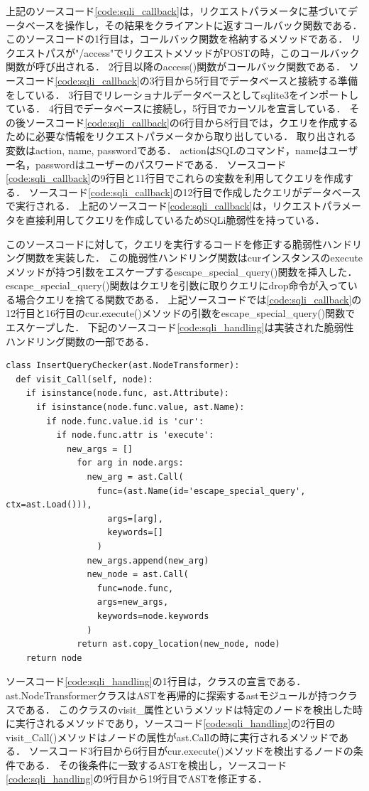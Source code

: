 \documentclass[a4paper,12pt]{jreport}
\begin{document}
上記のソースコード\ref{code:sqli_callback}は，リクエストパラメータに基づいてデータベースを操作し，その結果をクライアントに返すコールバック関数である．
このソースコードの1行目は，コールバック関数を格納するメソッドである．
リクエストパスが"/access"でリクエストメソッドがPOSTの時，このコールバック関数が呼び出される．
2行目以降のaccess()関数がコールバック関数である．
ソースコード\ref{code:sqli_callback}の3行目から5行目でデータベースと接続する準備をしている．
3行目でリレーショナルデータベースとしてsqlite3をインポートしている．
4行目でデータベースに接続し，5行目でカーソルを宣言している．
その後ソースコード\ref{code:sqli_callback}の6行目から8行目では，クエリを作成するために必要な情報をリクエストパラメータから取り出している．
取り出される変数はaction, name, passwordである．
actionはSQLのコマンド，nameはユーザー名，passwordはユーザーのパスワードである．
ソースコード\ref{code:sqli_callback}の9行目と11行目でこれらの変数を利用してクエリを作成する．
ソースコード\ref{code:sqli_callback}の12行目で作成したクエリがデータベースで実行される．
上記のソースコード\ref{code:sqli_callback}は，リクエストパラメータを直接利用してクエリを作成しているためSQLi脆弱性を持っている．

このソースコードに対して，クエリを実行するコードを修正する脆弱性ハンドリング関数を実装した．
この脆弱性ハンドリング関数はcurインスタンスのexecuteメソッドが持つ引数をエスケープするescape\_special\_query()関数を挿入した．
escape\_special\_query()関数はクエリを引数に取りクエリにdrop命令が入っている場合クエリを捨てる関数である．
上記ソースコードでは\ref{code:sqli_callback}の12行目と16行目のcur.execute()メソッドの引数をescape\_special\_query()関数でエスケープした．
下記のソースコード\ref{code:sqli_handling}は実装された脆弱性ハンドリング関数の一部である．
\begin{lstlisting}[caption={SQLiの影響を低減するための脆弱性ハンドリング関数の一部}, label=code:sqli_handling, captionpos=b]
class InsertQueryChecker(ast.NodeTransformer):
  def visit_Call(self, node):
    if isinstance(node.func, ast.Attribute):
      if isinstance(node.func.value, ast.Name):
        if node.func.value.id is 'cur':
          if node.func.attr is 'execute':
            new_args = []
              for arg in node.args:
                new_arg = ast.Call(
                  func=(ast.Name(id='escape_special_query', ctx=ast.Load())),
                    args=[arg],
                    keywords=[]
                  )
                new_args.append(new_arg)
                new_node = ast.Call(
                  func=node.func,
                  args=new_args,
                  keywords=node.keywords
                )
              return ast.copy_location(new_node, node)
    return node
\end{lstlisting}
ソースコード\ref{code:sqli_handling}の1行目は，クラスの宣言である．
ast.NodeTransformerクラスはASTを再帰的に探索するastモジュールが持つクラスである．
このクラスのvisit\_属性というメソッドは特定のノードを検出した時に実行されるメソッドであり，ソースコード\ref{code:sqli_handling}の2行目のvisit\_Call()メソッドはノードの属性がast.Callの時に実行されるメソッドである．
ソースコード3行目から6行目がcur.execute()メソッドを検出するノードの条件である．
その後条件に一致するASTを検出し，ソースコード\ref{code:sqli_handling}の9行目から19行目でASTを修正する．
\end{document}

